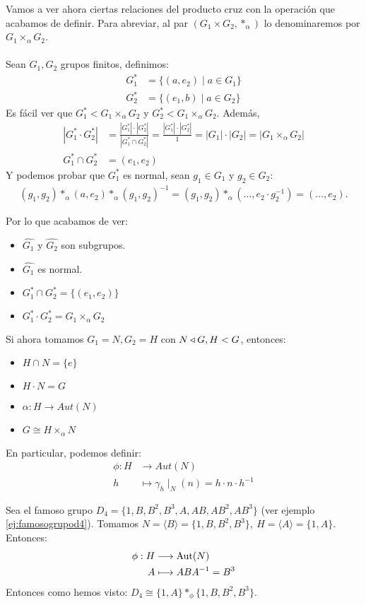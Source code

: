 Vamos a ver ahora ciertas relaciones del producto cruz con la operación que acabamos de definir. Para abreviar, al par $(G_1 \times G_2, \ast_\alpha)$ lo denominaremos por $G_1 \times_\alpha G_2$.\\\\
Sean $G_1, G_2$ grupos finitos, definimos:
\begin{align*}
	G_1^\ast &= \{(a, e_2) \mid a \in G_1\}\\
	G_2^\ast &= \{(e_1, b) \mid a \in G_2\}
\end{align*}
Es fácil ver que $G_1^\ast < G_1 \times_\alpha G_2$ y $G_2^\ast < G_1 \times_\alpha G_2$. Además,
\begin{align*}
	|G_1^\ast\cdot G_2^\ast| &= \frac{|G_1^\ast|\cdot |G_2^\ast|}{|G_1^\ast \cap G_2^\ast|} = \frac{|G_1^\ast|\cdot |G_2^\ast|}{1} = |G_1|\cdot |G_2| = |G_1 \times_\alpha G_2|\\
	G_1^\ast \cap G_2^\ast &= {(e_1, e_2)}
\end{align*}
Y podemos probar que $G_1^\ast$ es normal, sean $g_1 \in G_1$ y $g_2 \in G_2$:
\begin{align*}
	(g_1, g_2) \ast_\alpha (a, e_2) \ast_\alpha (g_1, g_2)^{-1} = (g_1,g_2)\ast_\alpha(\ldots, e_2\cdot g_2^{-1}) = (\ldots, e_2).
\end{align*}
\begin{cor}
	\label{cor:propiedadesgrupdirecto}
	Por lo que acabamos de ver:
	\begin{itemize}
		\item $\hat{G_1}$ y $\hat{G_2}$ son subgrupos.
		\item $\hat{G_1}$ es normal.
		\item $G_1^\ast \cap G_2^\ast = \{(e_1,e_2)\}$
		\item $G_1^\ast \cdot G_2^\ast = G_1 \times_\alpha G_2$
	\end{itemize}
	Si ahora tomamos $G_1 = N, G_2 = H$ con $N \mathbin{\triangleleft} G, H < G$, entonces:
	\begin{itemize}
		\item $H \cap N = \{e\}$
		\item $H \cdot N = G$
		\item $\alpha: H \longrightarrow Aut(N)$
		\item $G \cong H \times_\alpha N$
	\end{itemize}
\end{cor}
En particular, podemos definir:
\begin{align*}
	\phi : H &\longrightarrow Aut(N)\\
	h &\longmapsto \gamma_h\mid_N(n) = h\cdot n\cdot h^{-1}
\end{align*}
\begin{ej}
	Sea el famoso grupo $D_4 = \{1,B,B^2,B^3,A,AB,AB^2,AB^3\}$ (ver ejemplo \ref{ej:famosogrupod4}). Tomamos $N = \langle B \rangle =\{1,B,B^2,B^3\},\ H = \langle A \rangle =\{1,A\}$. Entonces:
	\begin{align*}
		\phi: H &\longrightarrow \text{Aut}(N)\\
		A &\longmapsto ABA^{-1} = B^3
	\end{align*}
Entonces como hemos visto: $D_4 \cong \{1,A\} \ast_\phi \{1,B,B^2,B^3\}$.
\end{ej}
